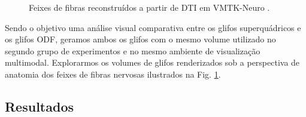 \begin{figure}[H]
{    \label{fig::tratos_4}
    }
    \caption{Feixes de fibras reconstruídos a partir de DTI em VMTK-Neuro \cite{VMTKNeuro}.}
    \label{fig::tratos}
\end{figure}




Sendo o objetivo uma análise visual comparativa entre os glifos superquádricos \cite{Kindlmann2004} e os glifos ODF, geramos ambos os glifos com o mesmo volume utilizado no segundo grupo de experimentos e no mesmo ambiente de visualização multimodal.
Explorarmos os volumes de glifos renderizados sob a perspectiva de anatomia dos feixes de fibras nervosas ilustrados na Fig. \ref{fig::tratos}.


\subsection{Resultados}
\label{ssec::visual_resultados}


